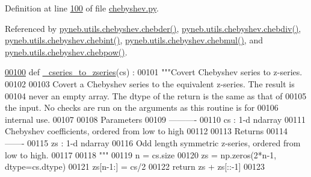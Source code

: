 Definition at line \hyperlink{chebyshev_8py_source_l00100}{100} of file \hyperlink{chebyshev_8py_source}{chebyshev.\+py}.



Referenced by \hyperlink{chebyshev_8py_source_l00841}{pyneb.\+utils.\+chebyshev.\+chebder()}, \hyperlink{chebyshev_8py_source_l00725}{pyneb.\+utils.\+chebyshev.\+chebdiv()}, \hyperlink{chebyshev_8py_source_l00912}{pyneb.\+utils.\+chebyshev.\+chebint()}, \hyperlink{chebyshev_8py_source_l00676}{pyneb.\+utils.\+chebyshev.\+chebmul()}, and \hyperlink{chebyshev_8py_source_l00790}{pyneb.\+utils.\+chebyshev.\+chebpow()}.


\begin{DoxyCode}
\hypertarget{namespacepyneb_1_1utils_1_1chebyshev_l00100}{}\hyperlink{namespacepyneb_1_1utils_1_1chebyshev_a659e346f7cdd9fd058850b26f7e95b17}{00100} \textcolor{keyword}{def }\hyperlink{namespacepyneb_1_1utils_1_1chebyshev_a659e346f7cdd9fd058850b26f7e95b17}{\_cseries\_to\_zseries}(cs) :
00101     \textcolor{stringliteral}{"""Covert Chebyshev series to z-series.}
00102 \textcolor{stringliteral}{}
00103 \textcolor{stringliteral}{    Covert a Chebyshev series to the equivalent z-series. The result is}
00104 \textcolor{stringliteral}{    never an empty array. The dtype of the return is the same as that of}
00105 \textcolor{stringliteral}{    the input. No checks are run on the arguments as this routine is for}
00106 \textcolor{stringliteral}{    internal use.}
00107 \textcolor{stringliteral}{}
00108 \textcolor{stringliteral}{    Parameters}
00109 \textcolor{stringliteral}{    ----------}
00110 \textcolor{stringliteral}{    cs : 1-d ndarray}
00111 \textcolor{stringliteral}{        Chebyshev coefficients, ordered from low to high}
00112 \textcolor{stringliteral}{}
00113 \textcolor{stringliteral}{    Returns}
00114 \textcolor{stringliteral}{    -------}
00115 \textcolor{stringliteral}{    zs : 1-d ndarray}
00116 \textcolor{stringliteral}{        Odd length symmetric z-series, ordered from  low to high.}
00117 \textcolor{stringliteral}{}
00118 \textcolor{stringliteral}{    """}
00119     n = cs.size
00120     zs = np.zeros(2*n-1, dtype=cs.dtype)
00121     zs[n-1:] = cs/2
00122     \textcolor{keywordflow}{return} zs + zs[::-1]
00123 
\end{DoxyCode}
\hypertarget{namespacepyneb_1_1utils_1_1chebyshev_adb39b6e9d3aba3bf3784a3364ec3e6ca}{}
